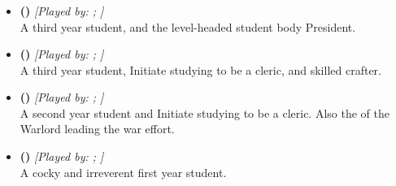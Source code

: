 \documentclass[blue]{GL2020}
\begin{document}
\subsubsection*{\pShip{}}
\begin{itemize}
    \item \textbf{\cPresident{\full} (\cPresident{\MYcharpronouns})} \textit{[Played by: \cPresident{\MYplayer}; \cPresident{\MYplayerpronouns}]}\\ A third year student, and the level-headed student body President.

    \item \textbf{\cInitiate{\full} (\cInitiate{\MYcharpronouns})} \textit{[Played by: \cInitiate{\MYplayer}; \cInitiate{\MYplayerpronouns}]}\\ A third year student, Initiate studying to be a cleric, and skilled crafter.
   	 
    \item \textbf{\cWarlordDaughter{\full} (\cWarlordDaughter{\MYcharpronouns})} \textit{[Played by: \cWarlordDaughter{\MYplayer}; \cWarlordDaughter{\MYplayerpronouns}]}\\ A second year student and Initiate studying to be a cleric. Also the \cWarlordDaughter{\child} of the Warlord leading the \pShip{} war effort.
   		 
    \item \textbf{\cPirateChild{\full} (\cPirateChild{\MYcharpronouns})} \textit{[Played by: \cPirateChild{\MYplayer}; \cPirateChild{\MYplayerpronouns}]}\\ A cocky and irreverent first year student.
   	 
\end{itemize}
\end{document}
